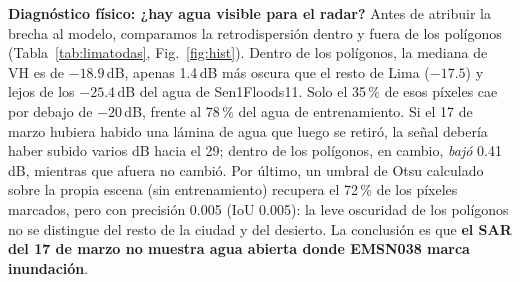 {\textbf{Diagnóstico físico: ¿hay agua visible para el radar?} Antes de atribuir la brecha al modelo, comparamos la retrodispersión dentro y fuera de los polígonos (Tabla~\ref{tab:limatodas}, Fig.~\ref{fig:hist}). Dentro de los polígonos, la mediana de VH es de $-18.9$\,dB, apenas 1.4\,dB más oscura que el resto de Lima ($-17.5$) y lejos de los $-25.4$\,dB del agua de Sen1Floods11. Solo el 35\,\% de esos píxeles cae por debajo de $-20$\,dB, frente al 78\,\% del agua de entrenamiento. Si el 17 de marzo hubiera habido una lámina de agua que luego se retiró, la señal debería haber subido varios dB hacia el 29; dentro de los polígonos, en cambio, \emph{bajó} 0.41\,dB, mientras que afuera no cambió. Por último, un umbral de Otsu calculado sobre la propia escena (sin entrenamiento) recupera el 72\,\% de los píxeles marcados, pero con precisión 0.005 (IoU 0.005): la leve oscuridad de los polígonos no se distingue del resto de la ciudad y del desierto. La conclusión es que \textbf{el SAR del 17 de marzo no muestra agua abierta donde EMSN038 marca inundación}.}


